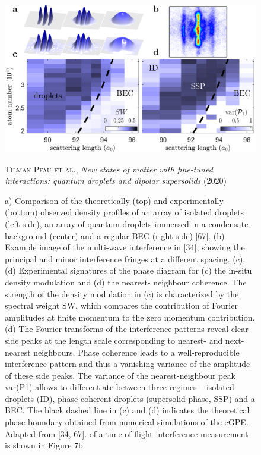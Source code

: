 \begin{figure}[H]
    \centering
    \includegraphics[width=1.0\textwidth]{IMAGE/supersolids_exist.png}\\
    \caption{
        a) Comparison of the theoretically (top) and experimentally (bottom)
        observed density profiles of an array of isolated droplets (left side), an array of quantum
        droplets immersed in a condensate background (center) and a regular BEC (right side)
        [67]. (b) Example image of the multi-wave interference in [34], showing the principal
        and minor interference fringes at a different spacing. (c), (d) Experimental signatures
        of the phase diagram for (c) the in-situ density modulation and (d) the nearest-
        neighbour coherence. The strength of the density modulation in (c) is characterized
        by the spectral weight SW, which compares the contribution of Fourier amplitudes at
        finite momentum to the zero momentum contribution. (d) The Fourier transforms of
        the interference patterns reveal clear side peaks at the length scale corresponding to
        nearest- and next-nearest neighbours. Phase coherence leads to a well-reproducible
        interference pattern and thus a vanishing variance of the amplitude of these side
        peaks.
        The variance of the nearest-neighbour peak var(P1) allows to differentiate
        between three regimes – isolated droplets (ID), phase-coherent droplets (supersolid
        phase, SSP) and a BEC. The black dashed line in (c) and (d) indicates the theoretical
        phase boundary obtained from numerical simulations of the eGPE. Adapted from
        [34, 67].
        of a time-of-flight interference measurement is shown in Figure 7b.
      }
    \textsc{Tilman Pfau et al.}, \emph{New states of matter with fine-tuned interactions:
        quantum droplets and dipolar supersolids} (2020)
    \label{fig:supersolids_exist}
\end{figure}

